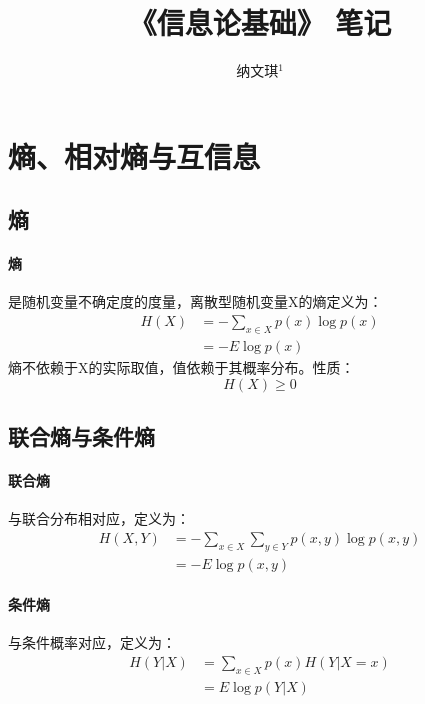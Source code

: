\documentclass[10pt,letterpaper]{article}
\begin{document}

\title{《信息论基础》\cite{cover2005信息论基础} 笔记}

\author{纳文琪$^{1}$}

\maketitle


\section{熵、相对熵与互信息}
\subsection{熵}
\paragraph{熵} 是随机变量不确定度的度量，离散型随机变量X的熵定义为：\\
\begin{equation}
	\begin{split}
		H(X) &= -\sum_{x\in X} p(x)\log p(x) \\
		&= -E \log{p(x)}
	\end{split}
\end{equation}
熵不依赖于X的实际取值，值依赖于其概率分布。性质：
\begin{equation}
	H(X) \geq 0
\end{equation}


\subsection{联合熵与条件熵}

\paragraph{联合熵} 与联合分布相对应，定义为：\\
\begin{equation}
	\begin{split}
		H(X,Y) &= -\sum_{x \in X} \sum_{y \in Y} p(x,y)\log {p(x,y)} \\
		&= -E \log{p(x,y)}
	\end{split}
\end{equation}

\paragraph{条件熵} 与条件概率对应，定义为： \\
\begin{equation}
	\begin{split}
		H(Y|X) &= \sum_{x \in X} p(x) H(Y|X=x) \\
		&= E \log{p(Y|X)}
	\end{split}
\end{equation}
\end{document}
